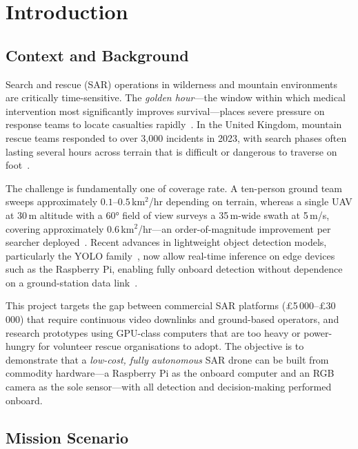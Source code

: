 
\section{Introduction}\label{sec:intro}

\subsection{Context and Background}\label{sec:context}

Search and rescue (SAR) operations in wilderness and mountain environments are critically time-sensitive. The \textit{golden hour}---the window within which medical intervention most significantly improves survival---places severe pressure on response teams to locate casualties rapidly~\cite{goodrich2008}. In the United Kingdom, mountain rescue teams responded to over 3{,}000 incidents in 2023, with search phases often lasting several hours across terrain that is difficult or dangerous to traverse on foot~\cite{mra2023}.

The challenge is fundamentally one of coverage rate. A ten-person ground team sweeps approximately $0.1$--$0.5$\,km$^{2}$/hr depending on terrain, whereas a single UAV at 30\,m altitude with a \ang{60} field of view surveys a 35\,m-wide swath at 5\,m/s, covering approximately $0.6$\,km$^{2}$/hr---an order-of-magnitude improvement per searcher deployed~\cite{goodrich2008, murphy2014}. Recent advances in lightweight object detection models, particularly the YOLO family~\cite{yolohistory, yolov8}, now allow real-time inference on edge devices such as the Raspberry Pi, enabling fully onboard detection without dependence on a ground-station data link~\cite{edgeai}.

This project targets the gap between commercial SAR platforms (\pounds5\,000--\pounds30\,000) that require continuous video downlinks and ground-based operators, and research prototypes using GPU-class computers that are too heavy or power-hungry for volunteer rescue organisations to adopt. The objective is to demonstrate that a \textit{low-cost, fully autonomous} SAR drone can be built from commodity hardware---a Raspberry Pi as the onboard computer and an RGB camera as the sole sensor---with all detection and decision-making performed onboard.

\subsection{Mission Scenario}\label{sec:scenario}

